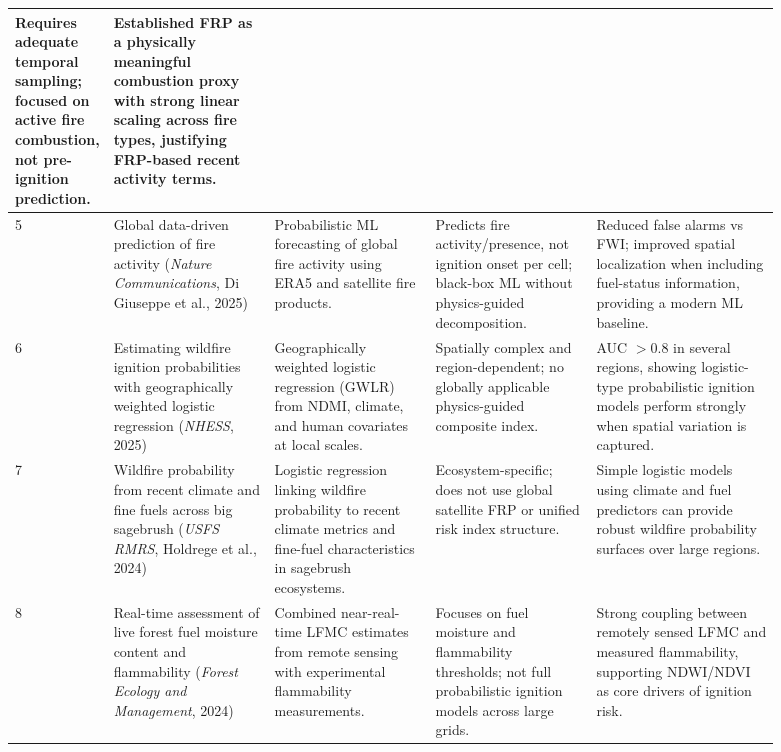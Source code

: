 \documentclass[conference]{IEEEtran}
\begin{document}
\begin{table}[t]
\begin{tabular}{|p{0.02\linewidth}|p{0.21\linewidth}|p{0.21\linewidth}|p{0.21\linewidth}|p{0.24\linewidth}|}
Requires adequate temporal sampling; focused on active fire combustion, not pre-ignition prediction. &
Established FRP as a physically meaningful combustion proxy with strong linear scaling across fire types, justifying FRP-based recent activity terms. \\
\hline
5 &
Global data-driven prediction of fire activity
(\textit{Nature Communications}, Di Giuseppe et al., 2025) &
Probabilistic ML forecasting of global fire activity using ERA5 and satellite fire products. &
Predicts fire activity/presence, not ignition onset per cell; black-box ML without physics-guided decomposition. &
Reduced false alarms vs FWI; improved spatial localization when including fuel-status information, providing a modern ML baseline. \\
\hline
6 &
Estimating wildfire ignition probabilities with geographically weighted logistic regression
(\textit{NHESS}, 2025) &
Geographically weighted logistic regression (GWLR) from NDMI, climate, and human covariates at local scales. &
Spatially complex and region-dependent; no globally applicable physics-guided composite index. &
AUC $>$0.8 in several regions, showing logistic-type probabilistic ignition models perform strongly when spatial variation is captured. \\
\hline
7 &
Wildfire probability from recent climate and fine fuels across big sagebrush
(\textit{USFS RMRS}, Holdrege et al., 2024) &
Logistic regression linking wildfire probability to recent climate metrics and fine-fuel characteristics in sagebrush ecosystems. &
Ecosystem-specific; does not use global satellite FRP or unified risk index structure. &
Simple logistic models using climate and fuel predictors can provide robust wildfire probability surfaces over large regions. \\
\hline
8 &
Real-time assessment of live forest fuel moisture content and flammability
(\textit{Forest Ecology and Management}, 2024) &
Combined near-real-time LFMC estimates from remote sensing with experimental flammability measurements. &
Focuses on fuel moisture and flammability thresholds; not full probabilistic ignition models across large grids. &
Strong coupling between remotely sensed LFMC and measured flammability, supporting NDWI/NDVI as core drivers of ignition risk. \\
\hline
\end{tabular}
\end{table}
\end{document}
